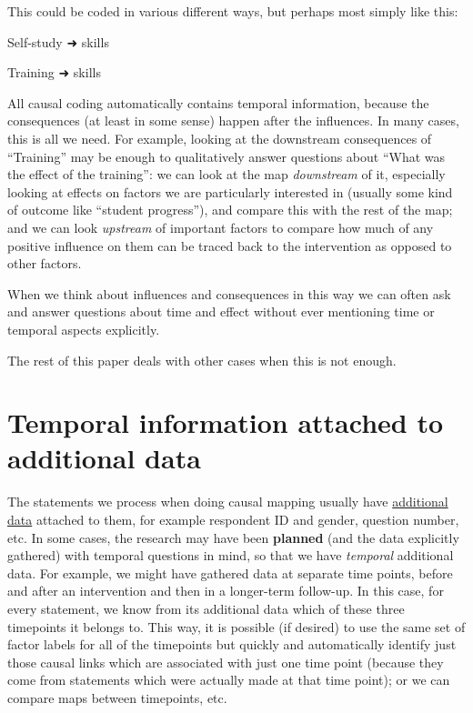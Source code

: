 \documentclass[
]{book}
\begin{document}
This could be coded in various different ways, but perhaps most simply like this:

Self-study ➜ skills

Training ➜ skills

All causal coding automatically contains temporal information, because the consequences (at least in some sense) happen after the influences. In many cases, this is all we need. For example, looking at the downstream consequences of ``Training'' may be enough to qualitatively answer questions about ``What was the effect of the training'': we can look at the map \emph{downstream} of it, especially looking at effects on factors we are particularly interested in (usually some kind of outcome like ``student progress''), and compare this with the rest of the map; and we can look \emph{upstream} of important factors to compare how much of any positive influence on them can be traced back to the intervention as opposed to other factors.

When we think about influences and consequences in this way we can often ask and answer questions about time and effect without ever mentioning time or temporal aspects explicitly.

The rest of this paper deals with other cases when this is not enough.

\hypertarget{temporal-information-attached-to-additional-data}{%
\section{Temporal information attached to additional data}\label{temporal-information-attached-to-additional-data}}

The statements we process when doing causal mapping usually have \href{https://causalmapdocumentation.blot.im/search?q=additional+data}{additional data} attached to them, for example respondent ID and gender, question number, etc. In some cases, the research may have been \textbf{planned} (and the data explicitly gathered) with temporal questions in mind, so that we have \emph{temporal} additional data. For example, we might have gathered data at separate time points, before and after an intervention and then in a longer-term follow-up. In this case, for every statement, we know from its additional data which of these three timepoints it belongs to. This way, it is possible (if desired) to use the same set of factor labels for all of the timepoints but quickly and automatically identify just those causal links which are associated with just one time point (because they come from statements which were actually made at that time point); or we can compare maps between timepoints, etc.
\end{document}
